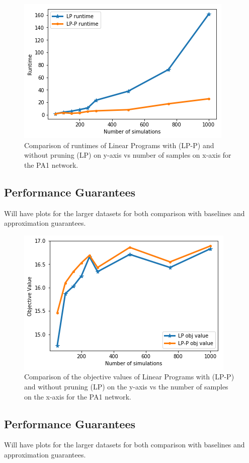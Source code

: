 \begin{figure}[!h]
    \centering
    \includegraphics[scale = 0.55]{Figuresnew/pa1_runtime.png}
    \caption{Comparison of runtimes of Linear Programs with (LP-P) and without pruning (LP) on y-axis vs 
number of samples on x-axis for the PA1 network. }
    \label{fig:pa1pruningtime}
\end{figure}
\subsection{Performance Guarantees}
Will have plots for the larger datasets for both comparison with baselines and approximation guarantees.



\begin{figure}[!h]
    \centering
    \includegraphics[scale = 0.55]{Figuresnew/pa1_objpruning.png}
    \caption{Comparison of the objective values of Linear Programs with (LP-P) and without pruning (LP) on the y-axis
vs the number of samples on the x-axis for the PA1 network. }
    \label{fig:pa1pruningobj}
\end{figure}

\subsection{Performance Guarantees}
Will have plots for the larger datasets for both comparison with baselines and approximation guarantees.

